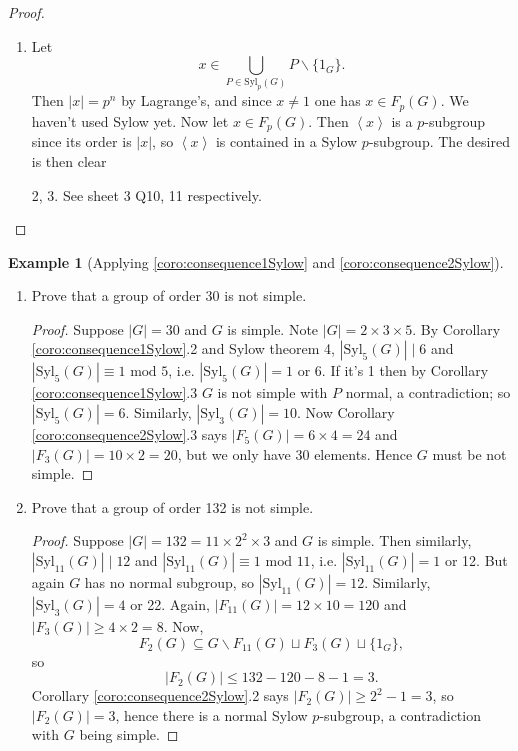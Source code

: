 \documentclass[a4paper]{article}
\newcommand{\la}{\left\langle}
\newcommand{\ra}{\right\rangle}
\newcommand{\Syl}{\text{Syl}}
\newcommand{\Mod}{\text{ mod }}
\theoremstyle{definition}
\newtheorem{example}[defn]{Example}
\begin{document}
\begin{proof}
\begin{enumerate}
\item Let \[
x\in \bigcup_{P\in\Syl_p(G)} P\backslash \{1_G\}.
\]
Then $|x|=p^n$ by Lagrange's, and since $x\neq 1$ one has $x\in F_p(G)$. We haven't used Sylow yet. Now let $x\in F_p(G)$. Then $\la x\ra$ is a $p$-subgroup since its order is $|x|$, so $\la x\ra$ is contained in a Sylow $p$-subgroup. The desired is then clear
\item[2, 3.] See sheet 3 Q10, 11 respectively.
\end{enumerate}
\end{proof}

\begin{example}[Applying \ref{coro:consequence1Sylow} and \ref{coro:consequence2Sylow}]
\label{example:strategy2}
\begin{enumerate}
\item Prove that a group of order 30 is not simple.
\begin{proof}
Suppose $|G|=30$ and $G$ is simple. Note $|G|=2\times 3\times 5$. By Corollary \ref{coro:consequence1Sylow}.2 and Sylow theorem 4, $|\Syl_5(G)|\mid 6$ and $|\Syl_5(G)|\equiv 1\Mod 5$, i.e. $|\Syl_5(G)|=1$ or 6. If it's 1 then by Corollary \ref{coro:consequence1Sylow}.3 $G$ is not simple with $P$ normal, a contradiction; so $|\Syl_5(G)|=6$. Similarly, $|\Syl_3(G)|=10$. Now Corollary \ref{coro:consequence2Sylow}.3 says $|F_5(G)|=6\times 4=24$ and $|F_3(G)|=10\times 2=20$, but we only have 30 elements. Hence $G$ must be not simple.
\end{proof}
\item Prove that a group of order 132 is not simple.
\begin{proof}
Suppose $|G|=132=11\times 2^2\times 3$ and $G$ is simple. Then similarly, $|\Syl_{11}(G)| \mid 12$ and $|\Syl_{11}(G)|\equiv 1\Mod 11$, i.e. $|\Syl_{11}(G)|=1$ or 12. But again $G$ has no normal subgroup, so $|\Syl_{11}(G)|=12$. Similarly, $|\Syl_3(G)|=4$ or 22. Again, $|F_{11}(G)|=12\times 10=120$ and $|F_3(G)|\geq 4\times 2=8$. Now,
\[
F_2(G)\subseteq G\backslash F_{11}(G) \sqcup F_3(G) \sqcup \{1_G\},
\]
so
\[
|F_2(G)|\leq 132-120-8-1=3.
\]
Corollary \ref{coro:consequence2Sylow}.2 says $|F_2(G)|\geq 2^2-1=3$, so $|F_2(G)|=3$, hence there is a normal Sylow $p$-subgroup, a contradiction with $G$ being simple.
\end{proof}
\end{enumerate}
\end{example}
\end{document}
